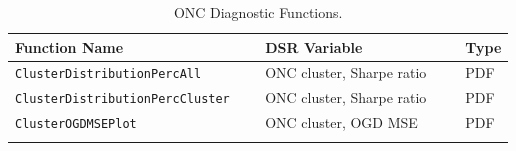 \documentclass[a4paper,11pt,oneside]{article}
\theoremstyle{plain}
\theoremstyle{definition}
\begin{document}
	\begin{longtable}{|p{0.5\linewidth}|p{0.4\linewidth}|p{0.1\linewidth}|}
	\hline
	\rowcolor{beaublue}
	\textbf{Function Name} &\textbf{DSR Variable}&\textbf{Type}  \\\hline	
	\texttt{ClusterDistributionPercAll} & {ONC cluster, Sharpe ratio}& {PDF} \\\hline
	\texttt{ClusterDistributionPercCluster} & {ONC cluster, Sharpe ratio}& {PDF} \\\hline
	\texttt{ClusterOGDMSEPlot} & {ONC cluster, OGD MSE}& {PDF} \\\hline
	\caption{ONC Diagnostic Functions.}
	\label{tab_diagnostics_onc}
\end{longtable}
	
	\newpage
	
	
	
	
	
	
	
	
\end{document}
